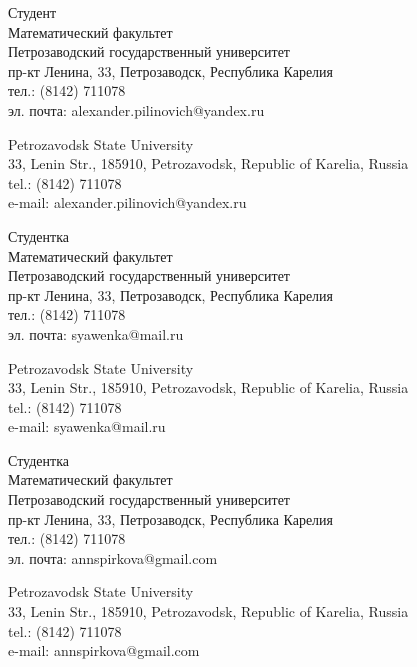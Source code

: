 \documentclass{article}
\begin{document}
\begin{aboutauthors}
Студент\\
Математический факультет\\ 
Петрозаводский государственный университет\\
пр-кт Ленина, 33, Петрозаводск, Республика Карелия\\
тел.: (8142) 711078\\
эл. почта: alexander.pilinovich@yandex.ru

\columnbreak

Petrozavodsk State University\\
33, Lenin Str., 185910, Petrozavodsk, Republic of Karelia, Russia\\
tel.: (8142) 711078\\
e-mail: alexander.pilinovich@yandex.ru 
\end{aboutauthors}

\begin{aboutauthors}
Студентка\\
Математический факультет\\ 
Петрозаводский государственный университет\\
пр-кт Ленина, 33, Петрозаводск, Республика Карелия\\
тел.: (8142) 711078\\
эл. почта: syawenka@mail.ru

\columnbreak

Petrozavodsk State University\\
33, Lenin Str., 185910, Petrozavodsk, Republic of Karelia, Russia\\
tel.: (8142) 711078\\
e-mail: syawenka@mail.ru 
\end{aboutauthors}

\begin{aboutauthors}
Студентка\\
Математический факультет\\ 
Петрозаводский государственный университет\\
пр-кт Ленина, 33, Петрозаводск, Республика Карелия\\
тел.: (8142) 711078\\
эл. почта: annspirkova@gmail.com

\columnbreak

Petrozavodsk State University\\
33, Lenin Str., 185910, Petrozavodsk, Republic of Karelia, Russia\\
tel.: (8142) 711078\\
e-mail: annspirkova@gmail.com
\end{aboutauthors}
\end{document}
